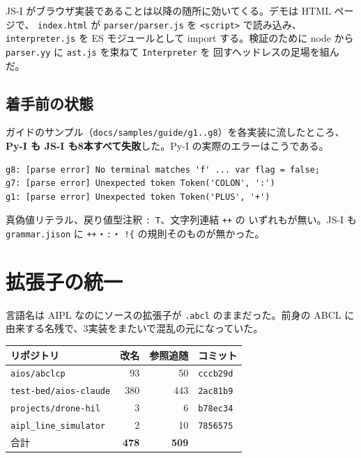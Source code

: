 \documentclass[11pt,a4paper]{ltjsarticle}
\begin{document}
JS-I がブラウザ実装であることは以降の随所に効いてくる。デモは HTML ページで、
\texttt{index.html} が \texttt{parser/parser.js} を \texttt{<script>} で読み込み、
\texttt{interpreter.js} を ES モジュールとして import する。検証のために
node から \texttt{parser.yy} に \texttt{ast.js} を束ねて \texttt{Interpreter} を
回すヘッドレスの足場を組んだ。

\subsection{着手前の状態}

ガイドのサンプル（\texttt{docs/samples/guide/g1..g8}）を各実装に流したところ、
\textbf{Py-I も JS-I も8本すべて失敗}した。Py-I の実際のエラーはこうである。

\begin{lstlisting}
g8: [parse error] No terminal matches 'f' ... var flag = false;
g7: [parse error] Unexpected token Token('COLON', ':')
g1: [parse error] Unexpected token Token('PLUS', '+')
\end{lstlisting}

\noindent 真偽値リテラル、戻り値型注釈 \verb|: T|、文字列連結 \verb|++| の
いずれもが無い。JS-I も \texttt{grammar.jison} に \verb|++|・\verb|:|・
\verb|!{| の規則そのものが無かった。

\section{拡張子の統一}

言語名は AIPL なのにソースの拡張子が \texttt{.abcl} のままだった。前身の
ABCL に由来する名残で、3実装をまたいで混乱の元になっていた。

\begin{center}
\small
\begin{tabular}{@{}lrrl@{}}
\toprule
リポジトリ & 改名 & 参照追随 & コミット \\
\midrule
\texttt{aios/abclcp} & 93 & 50 & \texttt{cccb29d} \\
\texttt{test-bed/aios-claude} & 380 & 443 & \texttt{2ac81b9} \\
\texttt{projects/drone-hil} & 3 & 6 & \texttt{b78ec34} \\
\texttt{aipl\_line\_simulator} & 2 & 10 & \texttt{7856575} \\
\midrule
合計 & \textbf{478} & \textbf{509} & \\
\bottomrule
\end{tabular}
\end{center}
\end{document}
